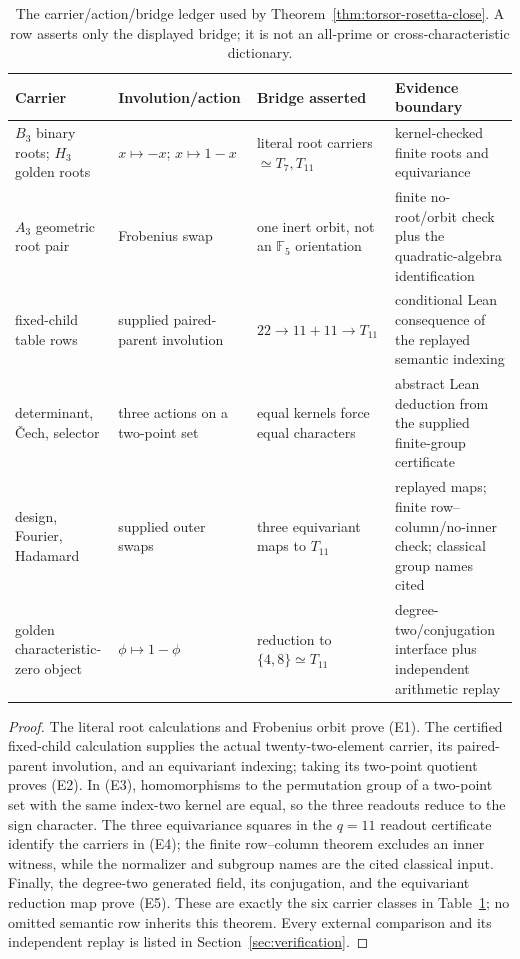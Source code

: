 \documentclass[11pt]{article}
\theoremstyle{definition}
\theoremstyle{remark}
\newcommand{\F}{\mathbb{F}}
\begin{document}
\begin{table}[H]
\centering
\small
\begin{tabular}{@{}p{}p{}
                    p{}p{}@{}}
\toprule
Carrier & Involution/action & Bridge asserted & Evidence boundary\\
\midrule
$B_3$ binary roots; $H_3$ golden roots
& $x\mapsto-x$; $x\mapsto1-x$
& literal root carriers $\simeq T_7,T_{11}$
& kernel-checked finite roots and equivariance\\
$A_3$ geometric root pair
& Frobenius swap
& one inert orbit, not an $\F_5$ orientation
& finite no-root/orbit check plus the quadratic-algebra identification\\
fixed-child table rows
& supplied paired-parent involution
& $22\to11+11\to T_{11}$
& conditional Lean consequence of the replayed semantic indexing\\
determinant, \v{C}ech, selector
& three actions on a two-point set
& equal kernels force equal characters
& abstract Lean deduction from the supplied finite-group certificate\\
design, Fourier, Hadamard
& supplied outer swaps
& three equivariant maps to $T_{11}$
& replayed maps; finite row--column/no-inner check; classical group names cited\\
golden characteristic-zero object
& $\phi\mapsto1-\phi$
& reduction to $\{4,8\}\simeq T_{11}$
& degree-two/conjugation interface plus independent arithmetic replay\\
\bottomrule
\end{tabular}
\caption{The carrier/action/bridge ledger used by
Theorem~\ref{thm:torsor-rosetta-close}.  A row asserts only the displayed
bridge; it is not an all-prime or cross-characteristic dictionary.}
\label{tab:torsor-carriers}
\end{table}

\begin{proof}
The literal root calculations and Frobenius orbit prove (E1).
The certified fixed-child calculation supplies the actual twenty-two-element carrier,
its paired-parent involution, and an equivariant indexing; taking its
two-point quotient proves (E2).  In (E3), homomorphisms to the permutation
group of a two-point set with the same index-two kernel are equal, so the
three readouts reduce to the sign character.  The three equivariance
squares in the $q=11$ readout certificate identify the carriers in (E4);
the finite row--column theorem excludes an inner witness, while the
normalizer and subgroup names are the cited classical input.  Finally, the
degree-two generated field, its conjugation, and the equivariant reduction
map prove (E5).  These are exactly the six carrier classes in
Table~\ref{tab:torsor-carriers}; no omitted semantic row inherits this
theorem.  Every external comparison and its independent replay is listed
in Section~\ref{sec:verification}.
\end{proof}
\end{document}
